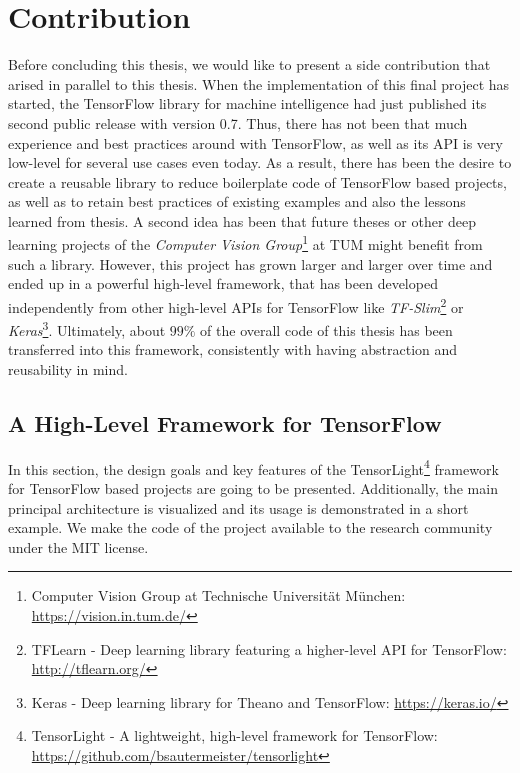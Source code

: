 
\iffalse
\chapter{Contribution} \label{chapter:contribution}

Before concluding this thesis, we would like to present a side contribution that arised in parallel to this thesis. When the implementation of this final project has started, the TensorFlow library for machine intelligence had just published its second public release with version \num{0.7}. Thus, there has not been that much experience and best practices around with TensorFlow, as well as its API is very low-level for several use cases even today. As a result, there has been the desire to create a reusable library to reduce boilerplate code of TensorFlow based projects, as well as to retain best practices of existing examples and also the lessons learned from thesis. A second idea has been that future theses or other deep learning projects of the \textit{Computer Vision Group}\footnote{Computer Vision Group at Technische Universität München: \url{https://vision.in.tum.de/}} at TUM might benefit from such a library. However, this project has grown larger and larger over time and ended up in a powerful high-level framework, that has been developed independently from other high-level APIs for TensorFlow like \textit{TF-Slim}\footnote{TFLearn - Deep learning library featuring a higher-level API for TensorFlow: \url{http://tflearn.org/}} or \textit{Keras}\footnote{Keras - Deep learning library for Theano and TensorFlow: \url{https://keras.io/}}. Ultimately, about $ 99\% $ of the overall code of this thesis has been transferred into this framework, consistently with having abstraction and reusability in mind.

\section{A High-Level Framework for TensorFlow}

In this section, the design goals and key features of the TensorLight\footnote{TensorLight - A lightweight, high-level framework for TensorFlow:\\ \url{https://github.com/bsautermeister/tensorlight}} framework for TensorFlow based projects are going to be presented. Additionally, the main principal architecture is visualized and its usage is demonstrated in a short example. We make the code of the project available to the research community under the MIT license.

